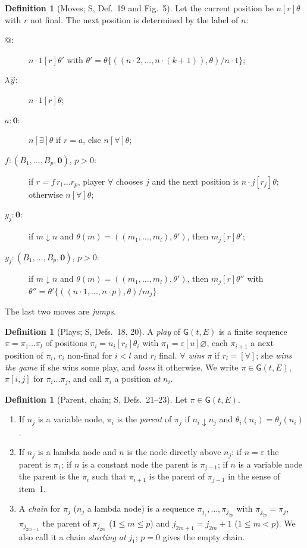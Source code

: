 \documentclass[11pt]{article}
\newcommand{\Ground}{\mathbf{0}}
\newcommand{\Gm}{\mathsf{G}}
\newcommand{\bnd}{\mathrel{\downarrow}}
\newcommand{\suc}[2]{#1{\cdot}#2}
\newcommand{\iv}[2]{\pi[#1,#2]}
\theoremstyle{plain}
\theoremstyle{definition}
\newtheorem{definition}[theorem]{Definition}
\theoremstyle{remark}
\begin{document}
\begin{definition}[Moves; S, Def.~19 and Fig.~5]\label{def:moves}
Let the current position be $n[r]\theta$ with $r$ not final.  The next
position is determined by the label of $n$:
\begin{description}
\item[$@$:] $\suc n1[r]\theta'$ with
  $\theta'=\theta\{((\suc n2,\dots,\suc n{(k+1)}),\theta)/\suc n1\}$;
\item[$\lambda\vec y$:] $\suc n1[r]\theta$;
\item[$a:\Ground$:] $n[\exists]\theta$ if $r=a$, else $n[\forall]\theta$;
\item[$f:(B_1,\dots,B_p,\Ground)$, $p>0$:] if $r=f\,r_1\dots r_p$, player
  $\forall$ chooses $j$ and the next position is $\suc nj[r_j]\theta$;
  otherwise $n[\forall]\theta$;
\item[$y_j:\Ground$:] if $m\bnd n$ and $\theta(m)=((m_1,\dots,m_l),\theta')$,
  then $m_j[r]\theta'$;
\item[$y_j:(B_1,\dots,B_p,\Ground)$, $p>0$:] if $m\bnd n$ and
  $\theta(m)=((m_1,\dots,m_l),\theta')$, then $m_j[r]\theta''$ with
  $\theta''=\theta'\{((\suc n1,\dots,\suc np),\theta)/m_j\}$.
\end{description}
The last two moves are \emph{jumps}.
\end{definition}

\begin{definition}[Plays; S, Defs.~18, 20]
A \emph{play} of $\Gm(t,E)$ is a finite sequence $\pi=\pi_1\dots\pi_l$ of
positions $\pi_i=n_i[r_i]\theta_i$ with $\pi_1=\varepsilon[u]\varnothing$,
each $\pi_{i+1}$ a next position of $\pi_i$, $r_i$ non-final for $i<l$
and $r_l$ final.  $\forall$ \emph{wins} $\pi$ if $r_l=[\forall]$; she
\emph{wins the game} if she wins some play, and \emph{loses} it
otherwise.  We write $\pi\in\Gm(t,E)$, $\iv ij$ for $\pi_i\dots\pi_j$, and
call $\pi_i$ a position \emph{at} $n_i$.
\end{definition}

\begin{definition}[Parent, chain; S, Defs.~21--23]\label{def:parent}
Let $\pi\in\Gm(t,E)$.
\begin{enumerate}
\item If $n_j$ is a variable node, $\pi_i$ is the \emph{parent} of
  $\pi_j$ if $n_i\bnd n_j$ and $\theta_i(n_i)=\theta_j(n_i)$.
\item If $n_j$ is a lambda node and $n$ is the node directly above
  $n_j$: if $n=\varepsilon$ the parent is $\pi_1$; if $n$ is a constant
  node the parent is $\pi_{j-1}$; if $n$ is a variable node the parent
  is the $\pi_i$ such that $\pi_{i+1}$ is the parent of $\pi_{j-1}$ in the
  sense of item~1.
\item A \emph{chain} for $\pi_j$ ($n_j$ a lambda node) is a sequence
  $\pi_{j_1},\dots,\pi_{j_{2p}}$ with $\pi_{j_{2p}}=\pi_j$,
  $\pi_{j_{2m-1}}$ the parent of $\pi_{j_{2m}}$ ($1\le m\le p$) and
  $j_{2m+1}=j_{2m}+1$ ($1\le m<p$).  We also call it a chain
  \emph{starting at} $j_1$; $p=0$ gives the empty chain.
\end{enumerate}
\end{definition}
\end{document}
